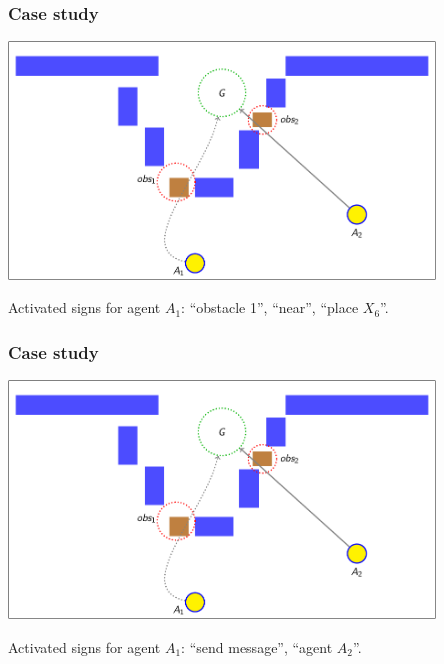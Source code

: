\documentclass[default]{beamer}
\begin{document}
	\begin{frame}
		\frametitle{Case study}
		
		\begin{center}
			\includegraphics[page=31,width=0.85\textwidth]{examples/slides_colored}
		\end{center}
		\par\bigskip
		Activated signs for agent $A_1$: ``obstacle 1'', ``near'', ``place $X_6$''.
	\end{frame}
	
	\begin{frame}
		\frametitle{Case study}
		
		\begin{center}
			\includegraphics[page=42,width=0.85\textwidth]{examples/slides_colored}
		\end{center}
		\par\bigskip
		Activated signs for agent $A_1$: ``send message'', ``agent $A_2$''.
	\end{frame}
	
\end{document}
